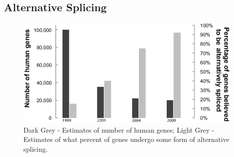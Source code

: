   \subsection{Alternative Splicing}\label{sec: AS}


    \citep{Kelemen2013}

    \citep{Barbosa-Morais2012,Merkin2012}  %

    \begin{figure}[htbp] %
      \centering 
      \includegraphics{Figures/Chapter1/numberHumanGenesAndNumberSpliced}
      \caption[Estimates of number of human genes, and percentage alternatively spliced over time]
      {
      Dark Grey - Estimates of number of human genes; Light Grey - Estimates of what percent of genes undergo some form of alternative splicing.
      }
      \label{fig:numGenesAndNumSpliced}
      \end{figure}

